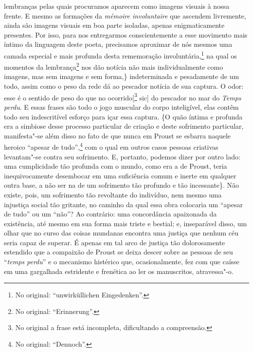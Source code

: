 lembranças pelas quais procuramos aparecem como imagens visuais à nossa
frente. E mesmo as formações da \emph{mémoire involuntaire} que ascendem
livremente, ainda são imagens visuais em boa parte isoladas, apenas
enigmaticamente presentes. Por isso, para nos entregarmos
conscientemente a esse movimento mais íntimo da linguagem deste poeta,
precisamos aproximar de nós mesmos uma camada especial e mais profunda
desta rememoração involuntária,\footnote{No original:
``unwirküllichen Eingedenken''. \versal{[N. T.]}} na qual os momentos da
lembrança\footnote{No original: ``Erinnerung''. \versal{[N. T.]}} nos dão notícia
não mais individualmente como imagens, mas sem imagens e sem forma,\}
indeterminada e pesadamente de um todo, assim como o peso da rede dá ao
pescador notícia de sua captura. O odor: esse é o sentido de peso do que
no ocorrido{[}\footnote{No original a frase está incompleta,
  dificultando a compreensão. \versal{[N. T.]}} sic{]} do pescador no mar do \emph{Temps
perdu}. E essas frases são todo o jogo muscular do corpo inteligível,
elas contêm todo seu indescritível esforço para içar essa captura. \{O
quão íntima e profunda era a simbiose desse processo particular de
criação e deste sofrimento particular, manifesta"-se além disso no fato
de que nunca em Proust se esbarra naquele heroico ``apesar de
tudo'',\footnote{No original: ``Dennoch''. \versal{[N. T.]}} com o qual em outros
casos pessoas criativas levantam"-se contra seu sofrimento. E, portanto,
podemos dizer por outro lado: uma cumplicidade tão profunda com o mundo,
como era a de Proust, teria inequivocamente desembocar em uma
suficiência comum e inerte em qualquer outra base, a não ser na de um
sofrimento tão profundo e tão incessante\}. Não existe, pois, um
sofrimento tão revoltante do indivíduo, nem mesmo uma injustiça social
tão gritante, no caminho da qual essa obra colocaria um ``apesar de
tudo'' ou um ``não''? Ao contrário: uma concordância apaixonada da
existência, até mesmo em sua forma mais triste e bestial; e, inseparável
disso, um olhar que no curso das coisas mundanas encontra uma justiça
que nenhum céu seria capaz de superar. É apenas em tal arco de justiça
tão dolorosamente estendido que a compaixão de Proust se deixa descer
sobre as pessoas de seu ``\emph{temps perdu}'' e o mecanismo histérico
que, ocasionalmente, fez com que caísse em uma gargalhada estridente e
frenética ao ler os manuscritos, atravessa"-o.

